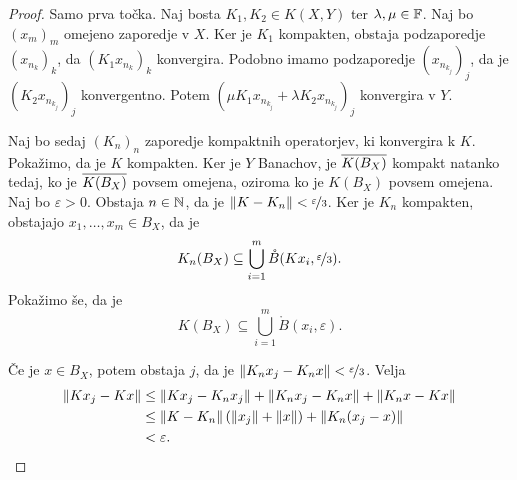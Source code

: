 \begin{proof}
  Samo prva točka.
  Naj bosta $K_1, K_2 \in K(X,Y)$ ter $\lambda, \mu \in \mathbb{F}$.
  Naj bo $(x_m)_m$ omejeno zaporedje v $X$.
  Ker je $K_1$ kompakten, obstaja podzaporedje $(x_{n_k})_k$, da $(K_1
  x_{n_k})_k$ konvergira.
  Podobno imamo podzaporedje $(x_{n_{k_j}})_j$, da je $(K_2 x_{n_{k_j}})_j$
  konvergentno.
  Potem $(\mu K_1 x_{n_{k_j}} + \lambda K_2 x_{n_{k_j}})_j$ konvergira v $Y$.

  Naj bo sedaj $(K_n)_n$ zaporedje kompaktnih operatorjev, ki konvergira k $K$.
  Pokažimo, da je $K$ kompakten.
  Ker je $Y$ Banachov, je $\overline{K(B_X)}$ kompakt natanko tedaj, ko je
  $\overline{K(B_X)}$ povsem omejena, oziroma ko je $K(B_X)$ povsem omejena.
  Naj bo $\varepsilon > 0$.
  Obstaja $n \in \mathbb{N}$, da je $\left\lVert K - K_n\right\rVert < \nicefrac{\varepsilon}{3}$.
  Ker je $K_n$ kompakten, obstajajo $x_1, \ldots, x_m \in B_X$, da je
  \[
	K_n(B_X) \subseteq \bigcup_{i=1}^m \mathring{B}(Kx_i,
	\nicefrac{\varepsilon}{3}).
  \]
  Pokažimo še, da je
  \[
	K(B_X) \subseteq \bigcup_{i=1}^m \mathring{B}(x_i, \varepsilon).
  \]

  Če je $x \in B_X$, potem obstaja $j$, da je $\left\lVert K_n x_j - K_n x\right\rVert <
  \nicefrac{\varepsilon}{3}$.
  Velja
  \begin{align*}
	\left\lVert K x_j - K x\right\rVert
	&\le \left\lVert K x_j - K_n x_j\right\rVert + \left\lVert K_n x_j - K_n x\right\rVert + \left\lVert K_n x - Kx\right\rVert \\
	&\le \left\lVert K - K_n\right\rVert (\left\lVert x_j\right\rVert + \left\lVert x\right\rVert) + \left\lVert K_n(x_j - x)\right\rVert \\
	&< \varepsilon.
	  \qedhere
  \end{align*}
\end{proof}

